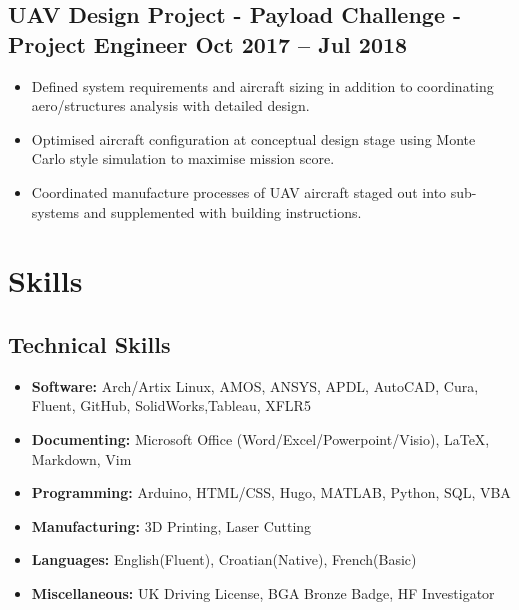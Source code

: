 \documentclass[a4paper,9pt]{article}
\begin{document}
\subsection*{\textbf{UAV Design Project - Payload Challenge - Project Engineer } \hfill  Oct 2017 – Jul 2018}

\begin{itemize}[noitemsep]
	\item Defined system requirements and aircraft sizing in addition to coordinating aero/structures analysis with detailed design.
	\item Optimised aircraft configuration at conceptual design stage using Monte Carlo style simulation to maximise mission score.
	\item Coordinated manufacture processes of UAV aircraft staged out into sub-systems and supplemented with building instructions.

\end{itemize}
%
%
%

\section*{Skills}
\subsection*{Technical Skills}
\begin{itemize}[noitemsep]
    \item \textbf{Software:} Arch/Artix Linux, AMOS, ANSYS, APDL, AutoCAD, Cura, Fluent, GitHub, SolidWorks,Tableau, XFLR5
    \item \textbf{Documenting:}  Microsoft Office (Word/Excel/Powerpoint/Visio), LaTeX, Markdown, Vim
    \item \textbf{Programming:}  Arduino, HTML/CSS, Hugo, MATLAB, Python, SQL, VBA
    \item \textbf{Manufacturing:} 3D Printing, Laser Cutting
    \item \textbf{Languages:} English(Fluent), Croatian(Native), French(Basic)
    \item \textbf{Miscellaneous:} UK Driving License, BGA Bronze Badge, HF Investigator
\end{itemize}



\date{}
\end{document}
